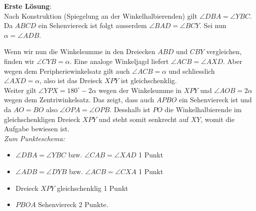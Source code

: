 \documentclass[12pt,a4paper]{article}
\theoremstyle{plain}
\theoremstyle{definition}
\theoremstyle{remark}
\begin{document}
\begin{enumerate}
\textbf{Erste Lösung}:\\
Nach Konstruktion (Spiegelung an der Winkelhalbierenden) gilt $\angle DBA = \angle YBC$. Da $ABCD$ ein Sehenviereck ist folgt ausserdem $\angle BAD = \angle BCY$. 
Sei nun $\alpha = \angle ADB$. 

Wenn wir nun die Winkelsumme in den Dreiecken $ABD$ und $CBY$ vergleichen, finden wir $\angle CYB = \alpha$. Eine analoge Winkeljagd liefert $\angle ACB = \angle AXD$. Aber wegen dem Peripheriewinkelsatz gilt auch $\angle ACB = \alpha$ und schliesslich $\angle AXD = \alpha$, also ist das Dreieck $XPY$ ist gleichschenklig. \\

Weiter gilt $\angle YPX = 180^{\circ} - 2\alpha$ wegen der Winkelsumme in $XPY$ und  $\angle AOB = 2\alpha$ wegen dem Zentriwinkelsatz. Das zeigt, dass auch $APBO$ ein Sehenviereck ist und da $AO = BO$ also $\angle OPA = \angle OPB$. Desshalb ist $PO$ die Winkelhalbierende im gleichschenkligen Dreieck $XPY$ und steht somit senkrecht auf $XY$, womit die Aufgabe bewiesen ist.\\

\emph{Zum Punkteschema:} \begin{itemize}
\item $\angle DBA = \angle YBC$ bzw. $\angle CAB = \angle XAD$ 1 Punkt
\item $\angle ADB = \angle DYB$ bzw. $\angle ACB = \angle CXA$ 1 Punkt
\item  Dreieck $XPY$ gleichschenklig 1 Punkt
\item  $PBOA$ Sehenviereck 2 Punkte.\\
\end{itemize}



\end{enumerate}
\end{document}
